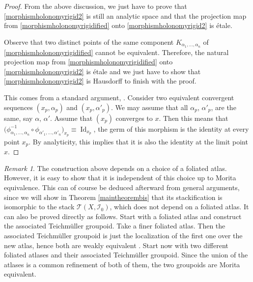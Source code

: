 \documentclass[10pt]{amsart}
\let\mathcal\mathscr
\DeclareMathOperator{\Id}{Id}
\theoremstyle{plain}
\theoremstyle{definition}
\theoremstyle{remark}
\newtheorem{remark}[theorem]{Remark}
\numberwithin{equation}{section}
\newcommand{\cI}{\mathcal{I}}
\begin{document}
\begin{proof}
From the above discussion, we just have to prove that \eqref{morphismholonomyrigid2} is still an analytic space and that the projection map from \eqref{morphismholonomyrigidified} onto \eqref{morphismholonomyrigid2} is étale.

Observe that two distinct points of the same component $K_{\alpha_1,\hdots,\alpha_n}$ of \eqref{morphismholonomyrigidified} cannot be equivalent. Therefore, the natural projection
map from \eqref{morphismholonomyrigidified} onto \eqref{morphismholonomyrigid2} is étale and we just have to show that \eqref{morphismholonomyrigid2} is Hausdorff to finish with the proof.

This comes from a standard argument, \cf \cite[Prop.\,3.2]{Brunella}. Consider two equivalent convergent sequences $(x_p,\alpha_p)$ and $(x_p, \alpha'_p)$. We may assume that all $\alpha_p$, \resp $\alpha'_p$, are the same, say $\alpha$, \resp $\alpha'$. Assume that $(x_p)$ converges to $x$. Then this means that $\big (\phi^{-1}_{\alpha_1,\hdots,\alpha_n}\circ \phi_{\alpha'_1,\hdots,\alpha'_n}\big )_{x_p}\equiv \Id_{x_p}$, \ie the germ of this morphism is the identity at every point $x_p$. By analyticity, this implies that it is also the identity at the limit point $x$.
\end{proof}

\begin{remark}
\label{moritaequivrigid}
The construction above depends on a choice of a foliated atlas. However, it is easy to show that it is independent of this choice up to Morita equivalence. This can of course be deduced afterward from general arguments, since we will show in Theorem \ref{maintheorembis} that its stackification is isomorphic to the stack $\mathcal T(X,\cI_0)$, which does not depend on a foliated atlas. It can also be proved directly as follows. Start with a foliated atlas and construct the associated Teichmüller groupoid. Take a finer foliated atlas. Then the associated Teichmüller groupoid is just the localization of the first one over the new atlas, hence both are weakly equivalent \cite{Ha}. Start now with two different foliated atlases and their associated Teichmüller groupoid. Since the union of the atlases is a common refinement of both of them, the two groupoids are Morita equivalent.
\end{remark}
\end{document}
